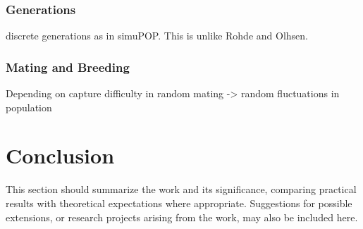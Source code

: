 \documentclass{l4proj}
\begin{document}
\subsection{Generations}
discrete generations as in simuPOP. This is unlike Rohde and Olhsen.

\subsection{Mating and Breeding}
Depending on 
capture difficulty in random mating -> random fluctuations in population 

\chapter{Conclusion}\label{conclusion}
This section should summarize the work and its significance, comparing practical results with theoretical expectations where appropriate. Suggestions for possible extensions, or research projects arising from the work, may also be included here.

\printglossaries
\printbibliography[heading=bibintoc]
\end{document}
